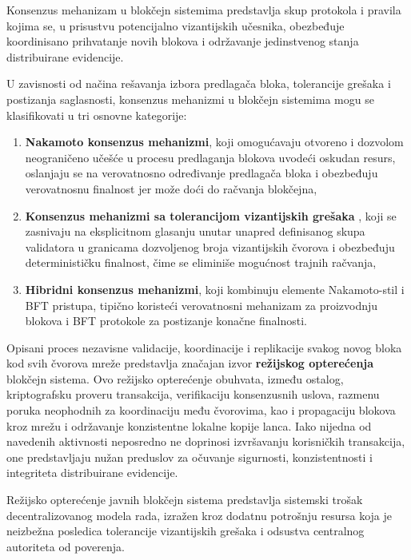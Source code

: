 \begin{definicija}
Konsenzus mehanizam u blokčejn sistemima predstavlja skup protokola i pravila kojima se, u prisustvu potencijalno vizantijskih učesnika, obezbeđuje koordinisano prihvatanje novih blokova i održavanje jedinstvenog stanja distribuirane evidencije.
\end{definicija}

U zavisnosti od načina rešavanja izbora predlagača bloka, tolerancije grešaka i postizanja saglasnosti, konsenzus mehanizmi u blokčejn sistemima \cite{zhou2023systematic} mogu se klasifikovati u tri osnovne kategorije:
\begin{enumerate}
\item \textbf{Nakamoto konsenzus mehanizmi}, koji omogućavaju otvoreno i dozvolom neograničeno učešće u procesu predlaganja blokova uvodeći oskudan resurs, oslanjaju se na verovatnosno određivanje predlagača bloka i obezbeđuju verovatnosnu finalnost jer može doći do račvanja  blokčejna,
\item \textbf{Konsenzus mehanizmi sa tolerancijom vizantijskih grešaka }, koji se zasnivaju na eksplicitnom glasanju unutar unapred definisanog skupa validatora u granicama dozvoljenog broja vizantijskih čvorova i obezbeđuju determinističku finalnost, čime se eliminiše mogućnost trajnih račvanja,
\item \textbf{Hibridni konsenzus mehanizmi}, koji kombinuju elemente Nakamoto-stil i BFT pristupa, tipično koristeći verovatnosni mehanizam za proizvodnju blokova i BFT protokole za postizanje konačne finalnosti.
\end{enumerate}

Opisani proces nezavisne validacije, koordinacije i replikacije svakog novog bloka kod svih čvorova mreže predstavlja značajan izvor \textbf{režijskog opterećenja} blokčejn sistema. Ovo režijsko opterećenje obuhvata, između ostalog, kriptografsku proveru transakcija, verifikaciju konsenzusnih uslova, razmenu poruka neophodnih za koordinaciju među čvorovima, kao i propagaciju blokova kroz mrežu i održavanje konzistentne lokalne kopije lanca. Iako nijedna od navedenih aktivnosti neposredno ne doprinosi izvršavanju korisničkih transakcija, one predstavljaju nužan preduslov za očuvanje sigurnosti, konzistentnosti i integriteta distribuirane evidencije.

\begin{posledica}
Režijsko opterećenje javnih blokčejn sistema predstavlja sistemski trošak decentralizovanog modela rada, izražen kroz dodatnu potrošnju resursa koja je neizbežna posledica tolerancije vizantijskih grešaka i odsustva centralnog autoriteta od poverenja.
\end{posledica}

